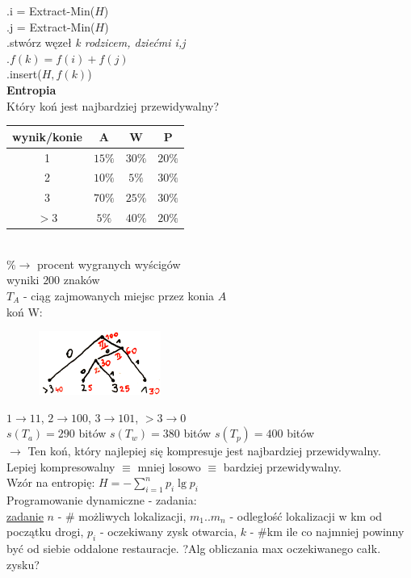 \documentclass[8pt,a3paper]{article}
\begin{document}
\begin{multicols*}{3}
	 .\quad i = Extract-Min($H$)\\
	 .\quad j = Extract-Min($H$)\\
	 .\quad stwórz węzeł \textit{k rodzicem, dziećmi i,j}\\
	 .\quad $f(k)=f(i)+f(j)$\\
	 .\quad insert($H,f(k)$)\\
	 \textbf{Entropia}\\
	 Który koń jest najbardziej przewidywalny? \\
	 \begin{tabular}{|c|c|c|c|}
	 	\hline 
	 	wynik/konie & A & W & P \\
	 	\hline 
	 	1 & $15\%$ & $30\%$ & $20\%$\\
	 	\hline
	 	2 & $10\%$ & $5\%$  & $30\%$ \\
	 	\hline
	 	3 & $70\%$ &$25\%$ & $30\%$ \\
	 	\hline
	 	$>$3 & $5\%$ & $40\%$ & $20\%$ \\
	 	\hline
	 \end{tabular} \\ 
	 $\%\to$ procent wygranych wyścigów \\
	 wyniki $200$ znaków \\
	 $T_{A}$ - ciąg zajmowanych miejsc przez konia $A$ \\
	 koń W: \\
	 \vspace{-0.85cm}
	 \begin{figure}[H]
 	 	\centering
 	 	\includegraphics[width=4cm]{horse.PNG}
	 \end{figure} 
	 \vspace{-0.6cm}
	 $1\to11$, $2\to100$, $3\to101$, $>3\to0$ \\
	 $s(T_{a}) = 290$ bitów \quad $s(T_{w}) = 380$ bitów  \quad $s(T_{p}) = 400$ bitów  \\
	 $\to$ Ten koń, który najlepiej się kompresuje jest najbardziej przewidywalny. Lepiej kompresowalny $\equiv$ mniej losowo $\equiv$ bardziej przewidywalny. \\
	 Wzór na entropię:
	 $H = - \sum_{i=1}^{n}p_{i}\lg p_{i}$ \\
	 \small{
	 Programowanie dynamiczne - zadania: \\
	 \underline{zadanie} $n$ - $\#$ możliwych lokalizacji, $m_{1}..m_{n}$ - odległość lokalizacji w km od początku drogi, $p_{i}$ - oczekiwany zysk otwarcia, $k$ - $\#$km ile co najmniej powinny być od siebie oddalone restauracje. ?Alg obliczania max oczekiwanego całk. zysku?\\
}
\end{multicols*}
\end{document}
